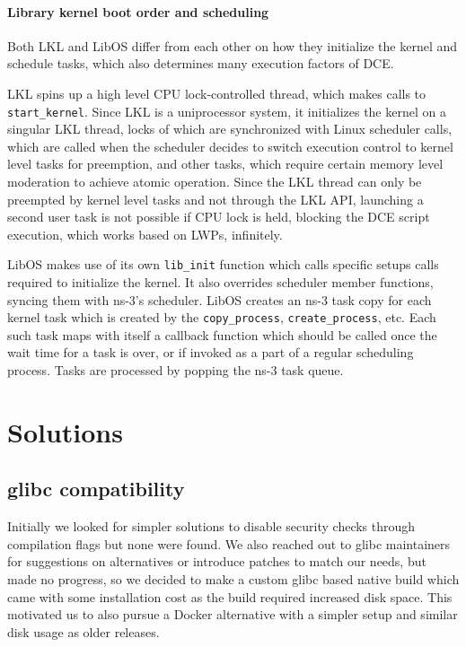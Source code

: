 \documentclass{sig-alternate}
\begin{document}
\paragraph{Library kernel boot order and scheduling}
Both LKL and LibOS differ from each other on how they initialize the kernel and schedule tasks, which also determines many execution factors of DCE. 

LKL spins up a high level CPU lock-controlled thread, which makes calls to \texttt{start\_kernel}. Since LKL is a uniprocessor system, it initializes 
the kernel on a singular LKL thread, 
locks of which are synchronized with Linux scheduler calls, which are called when the scheduler decides to switch execution control 
to kernel level tasks for preemption, and other tasks, which require certain memory level moderation to achieve
atomic operation. Since the LKL thread can only be preempted by kernel level tasks and not through the LKL API, launching a second user task is not possible if 
CPU lock is held, blocking the DCE script execution, which works based on LWPs, infinitely.

LibOS makes 
use of its own \texttt{lib\_init} function which calls specific setups calls required to initialize the kernel.
It also overrides scheduler member functions, syncing them with ns-3's 
scheduler. LibOS creates an ns-3 task copy for each kernel task which is created by the \texttt{copy\_process}, \texttt{create\_process},
etc. Each such task maps with itself a callback function which should be called once the wait time
for a task is over, or if invoked as a part of a regular scheduling process. Tasks are processed by popping the ns-3 task queue.

\section{Solutions}
\label{section:design}

\subsection{glibc compatibility}
Initially we looked for simpler solutions to disable security checks through compilation flags but none were found. We also reached out to glibc maintainers for 
suggestions on alternatives or introduce patches to match our needs, but made no progress, so we decided to make a custom glibc based native build which came with some
installation cost as the build required increased disk space. This motivated us to also pursue a Docker alternative with a simpler setup and similar disk usage as older releases.
\end{document}
